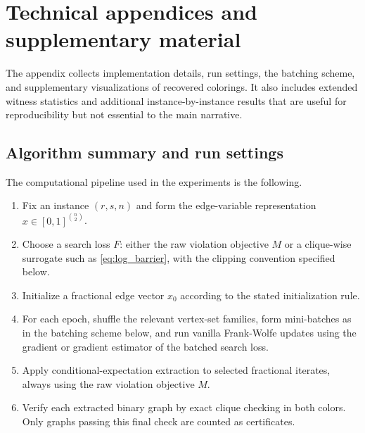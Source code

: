 \documentclass{article}
\begin{document}
\newpage




\newpage



\appendix

\section{Technical appendices and supplementary material}
The appendix collects implementation details, run settings, the batching scheme, and supplementary visualizations of recovered colorings. It also includes extended witness statistics and additional instance-by-instance results that are useful for reproducibility but not essential to the main narrative.

\subsection{Algorithm summary and run settings}\label{sec:algorithm-run-settings}

The computational pipeline used in the experiments is the following.
\begin{enumerate}
    \item Fix an instance $(r,s,n)$ and form the edge-variable representation $x \in [0,1]^{\binom{n}{2}}$.
    \item Choose a search loss $F$: either the raw violation objective $M$ or a clique-wise surrogate such as \cref{eq:log_barrier}, with the clipping convention specified below.
    \item Initialize a fractional edge vector $x_0$ according to the stated initialization rule.
    \item For each epoch, shuffle the relevant vertex-set families, form mini-batches as in the batching scheme below, and run vanilla Frank-Wolfe updates using the gradient or gradient estimator of the batched search loss.
    \item Apply conditional-expectation extraction to selected fractional iterates, always using the raw violation objective $M$.
    \item Verify each extracted binary graph by exact clique checking in both colors. Only graphs passing this final check are counted as certificates.
\end{enumerate}
\end{document}
